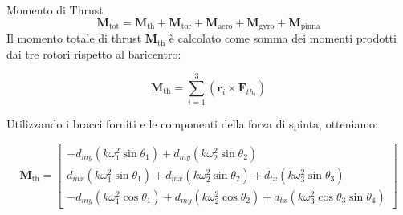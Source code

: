 \documentclass[aspectratio=169]{beamer} %
\begin{document}
\begin{frame}{Momento di Thrust}
    \begin{equation}
        \bm{M}_{\text{tot}} = \bm{M}_{\text{th}} + \bm{M}_{\text{tor}} + \bm{M}_{\text{aero}} + \bm{M}_{\text{gyro}} + \bm{M}_{\text{pinna}}
    \end{equation}
    Il momento totale di thrust $\bm{M}_{\text{th}}$ è calcolato come somma dei momenti prodotti dai tre rotori rispetto al baricentro:
    
    \begin{equation*}
        \bm{M}_{\text{th}} = \sum_{i=1}^{3} (\bm{r}_i \times \bm{F}_{th_{i}})
    \end{equation*}

    Utilizzando i bracci forniti e le componenti della forza di spinta, otteniamo:

    \begin{equation}
        \bm{M}_{\text{th}} = 
        \begin{bmatrix} 
        -d_{my} (k\omega_1^2 \sin\theta_1) + d_{my} (k\omega_2^2 \sin\theta_2) \\ 
        d_{mx} (k\omega_1^2 \sin\theta_1) + d_{mx} (k\omega_2^2 \sin\theta_2) + d_{tx} (k\omega_3^2 \sin\theta_3) \\ 
        -d_{my} (k\omega_1^2 \cos\theta_1) + d_{my} (k\omega_2^2 \cos\theta_2) + d_{tx} (k\omega_3^2 \cos\theta_3 \sin\theta_4)
        \end{bmatrix}
    \end{equation}
\end{frame}
\end{document}
